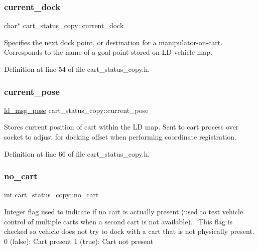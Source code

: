 \subsubsection{\texorpdfstring{current\+\_\+dock}{current\_dock}}
{\footnotesize\ttfamily char$\ast$ cart\+\_\+status\+\_\+copy\+::current\+\_\+dock\hspace{0.3cm}{\ttfamily [private]}}

Specifies the next dock point, or destination for a manipulator-\/on-\/cart. Corresponds to the name of a goal point stored on LD vehicle map. 

Definition at line 54 of file cart\+\_\+status\+\_\+copy.\+h.

\mbox{\label{classcart__status__copy_a0a127fed372d7db77bc202bcc3e15d76}} 
\subsubsection{\texorpdfstring{current\+\_\+pose}{current\_pose}}
{\footnotesize\ttfamily \mbox{\hyperlink{structld__msg__pose}{ld\+\_\+msg\+\_\+pose}} cart\+\_\+status\+\_\+copy\+::current\+\_\+pose\hspace{0.3cm}{\ttfamily [private]}}

Stores current position of cart within the LD map. Sent to cart process over socket to adjust for docking offset when performing coordinate registration. 

Definition at line 66 of file cart\+\_\+status\+\_\+copy.\+h.

\mbox{\label{classcart__status__copy_a33596a12e74edf48fb8c8d1ba03d98dd}} 
\subsubsection{\texorpdfstring{no\+\_\+cart}{no\_cart}}
{\footnotesize\ttfamily int cart\+\_\+status\+\_\+copy\+::no\+\_\+cart\hspace{0.3cm}{\ttfamily [private]}}

Integer flag used to indicate if no cart is actually present (used to test vehicle control of multiple carts when a second cart is not available).~\newline
This flag is checked so vehicle does not try to dock with a cart that is not physically present. 0 (false)\+: Cart present 1 (true)\+: Cart not present 


